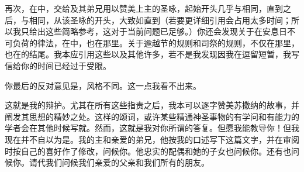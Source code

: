 再次，在中，交给及其弟兄用以赞美上主的圣咏，起始开头几乎与相同，直到之后，与相同，从该圣咏的开头，大致如直到（若要更详细引用会占用太多时间；所以我只给出这些简略参考，这对于当前问题已足够。）你还会发现关于在安息日不可负荷的律法，在中，也在那里。关于逾越节的规则和司祭的规则，不仅在那里，也在的结尾。我本应引用这些以及其他许多，若不是我发现因我在逗留短暂，我写信给你的时间已经过于受限。\par

你最后的反对意见是，风格不同。这一点我看不出来。\par

这就是我的辩护。尤其在所有这些指责之后，我本可以逐字赞美苏撒纳的故事，并阐发其思想的精妙之处。这样的颂词，或许某些精通神圣事物的有学问和有能力的学者会在其他时候写就。然而，这就是我对你所谓的答复。但愿我能教导你！但我现在并不自以为是。我的主和亲爱的弟兄，他按我的口述写下这篇文字，并在审阅时按自己的喜好作了修改，问候你。他忠实的配偶和她的子女也问候你。还有也问候你。请代我们问候我们亲爱的父亲和我们所有的朋友。\par

